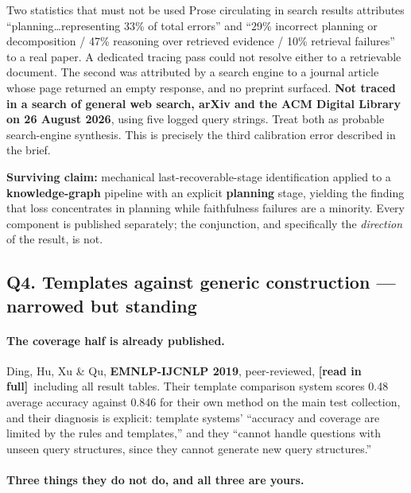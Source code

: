 \documentclass[11pt,a4paper]{article}
\newcommand{\vstanding}{\textcolor{standing}{\textbf{narrowed but standing}}}
\newcommand{\readtag}{\textcolor{standing}{\textbf{[read in full]}}}
\begin{document}
\begin{alertbox}{Two statistics that must not be used}
Prose circulating in search results attributes ``planning\ldots representing 33\% of
total errors'' and ``29\% incorrect planning or decomposition / 47\% reasoning over
retrieved evidence / 10\% retrieval failures'' to a real paper. A dedicated tracing
pass could not resolve either to a retrievable document. The second was attributed
by a search engine to a journal article whose page returned an empty response, and
no preprint surfaced. \textbf{Not traced in a search of general web search, arXiv
and the ACM Digital Library on 26 August 2026}, using five logged query strings.
Treat both as probable search-engine synthesis. This is precisely the third
calibration error described in the brief.
\end{alertbox}

\textbf{Surviving claim:} mechanical last-recoverable-stage identification applied
to a \textbf{knowledge-graph} pipeline with an explicit \textbf{planning} stage,
yielding the finding that loss concentrates in planning while faithfulness failures
are a minority. Every component is published separately; the conjunction, and
specifically the \emph{direction} of the result, is not.

\subsection{Q4. Templates against generic construction --- \texorpdfstring{\vstanding}{narrowed but standing}}

\paragraph{The coverage half is already published.} Ding, Hu, Xu \& Qu,
\textbf{EMNLP-IJCNLP 2019}, peer-reviewed, \readtag\ including all result tables.
Their template comparison system scores 0.48 average accuracy against 0.846 for
their own method on the main test collection, and their diagnosis is explicit:
template systems' ``accuracy and coverage are limited by the rules and templates,''
and they ``cannot handle questions with unseen query structures, since they cannot
generate new query structures.''

\paragraph{Three things they do not do, and all three are yours.}
\end{document}
